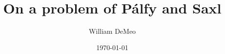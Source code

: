 \newcommand{\defn}[1]{{\it #1}}
\newcommand{\Peter}{P\'{e}ter\xspace}
\newcommand{\Palfy}{P\'{a}lfy\xspace}
\newcommand{\Pudlak}{Pudl\'ak\xspace}
\newcommand{\PP}{P\'{a}lfy-Pudl\'{a}k\xspace}
\newcommand{\PAP}{P\'{a}lfy\ and Pudl\'{a}k\xspace}
\newcommand{\N}{\ensuremath{\mathbb{N}}}
\newcommand{\bA}{\ensuremath{\mathbf{A}}}
\newcommand{\bS}{\ensuremath{\mathbf{S}}}
\newcommand{\bT}{\ensuremath{\mathbf{T}}}
\newcommand{\sP}{\ensuremath{\mathscr{P}}}
\newcommand{\sS}{\ensuremath{\mathcal{S}}}

\DeclareMathOperator{\typ}{typ}
\DeclareMathOperator{\id}{id}
\DeclareMathOperator{\Eq}{Eq}
\DeclareMathOperator{\Cg}{Cg}
\DeclareMathOperator{\Con}{Con}
\DeclareMathOperator{\Sub}{Sub}
\DeclareMathOperator{\Pol}{Pol}
\DeclareMathOperator{\Clo}{Clo}
\newcommand{\core}{\ensuremath{\operatorname{core}}}

\newcommand{\rel}{\ensuremath{\mathrel}}
\newcommand{\ralpha}{\ensuremath{\mathrel{\alpha}}}
\newcommand{\rbeta}{\ensuremath{\mathrel{\beta}}}
\newcommand{\rgamma}{\ensuremath{\mathrel{\gamma}}}
\newcommand{\rdelta}{\ensuremath{\mathrel{\tau}}}
\newcommand{\rrho}{\ensuremath{\mathrel{\tau}}}
\newcommand{\rtau}{\ensuremath{\mathrel{\tau}}}
\newcommand{\rtheta}{\ensuremath{\mathrel{\theta}}}
\newcommand{\sansC}{\ensuremath{\mathsf{C}}}
\newcommand{\hatmap}{\ensuremath{\widehat{\phantom{x}}}} %

\newcommand{\meet}{\ensuremath{\wedge}}
\newcommand{\join}{\ensuremath{\vee}}
\newcommand{\Meet}{\ensuremath{\bigwedge}}
\renewcommand{\Join}{\ensuremath{\bigvee}}
\newcommand{\nb}[1]{\ensuremath{|X/#1|}}




\title{On a problem of P\'{a}lfy and Saxl}
\author{William DeMeo}
\date{\today}

